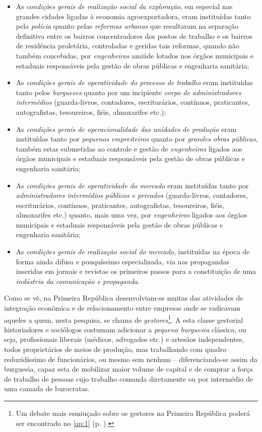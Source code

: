 \begin{itemize}
\item As \textit{condições gerais de realização social da exploração}, em especial nas grandes cidades ligadas à economia agroexportadora, eram instituídas tanto pela \textit{polícia} quanto pelas \textit{reformas urbanas} que resultaram na separação definitiva entre os bairros concentradores dos postos de trabalho e os bairros de residência proletária, controladas e geridas tais reformas, quando não também concebidas, por \textit{engenheiros} amiúde lotados nos órgãos municipais e estaduais responsáveis pela gestão de obras públicas e engenharia sanitária; 
\item As \textit{condições gerais de operatividade do processo de trabalho} eram instituídas tanto pelos \textit{burgueses} quanto por um incipiente \textit{corpo de administradores intermédios} (guarda-livros, contadores, escriturários, contínuos, praticantes, autografistas, tesoureiros, fiéis, almoxarifes etc.);
\item As \textit{condições gerais de operacionalidade das unidades de produção} eram instituídas tanto por \textit{pequenos empreiteiros} quanto por \textit{grandes obras públicas}, também estas submetidas ao controle e gestão de \textit{engenheiros} ligados aos órgãos municipais e estaduais responsáveis pela gestão de obras públicas e engenharia sanitária; 
\item As \textit{condições gerais de operatividade do mercado} eram instituídas tanto por \textit{administradores intermédios públicos e privados} (guarda-livros, contadores, escriturários, contínuos, praticantes, autografistas, tesoureiros, fiéis, almoxarifes etc.) quanto, mais uma vez, por \textit{engenheiros} ligados aos órgãos municipais e estaduais responsáveis pela gestão de obras públicas e engenharia sanitária; 
\item As \textit{condições gerais de realização social do mercado}, instituídas na época de forma ainda difusa e pouquíssimo especializada, via nas propagandas inseridas em jornais e revistas os primeiros passos para a constituição de uma \textit{indústria da comunicação e propaganda}.
\end{itemize}

Como se vê, na Primeira República desenvolviam-se muitas das atividades de integração econômica e de relacionamento entre empresas onde se radicavam aqueles a quem, nesta pesquisa, se chama de \textit{gestores}\footnote{Um debate mais esmiuçado sobre os gestores na Primeira República poderá ser encontrado no \autoref{ap:1} (p. \pageref{ap:1}).}. A esta classe gestorial historiadores e sociólogos costumam adicionar a \textit{pequena burguesia} clássica, ou seja, profissionais liberais (médicos, advogados etc.) e artesãos independentes, todos proprietários de meios de produção, mas trabalhando com quadro reduzidíssimo de funcionários, ou mesmo sem nenhum -- diferenciando-se assim da burguesia, capaz esta de mobilizar maior volume de capital e de comprar a força de trabalho de pessoas cujo trabalho comanda diretamente ou por intermédio de uma camada de burocratas.

